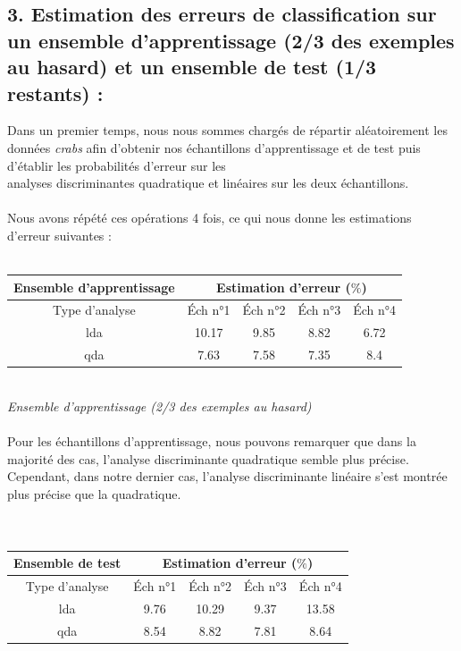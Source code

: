 \documentclass[a4paper, 10pt]{article}
\begin{document}
\newpage
\subsection*{3. Estimation des erreurs de classification sur un ensemble d'apprentissage (2/3 des exemples au hasard)
et un ensemble de test (1/3 restants) :}
Dans un premier temps, nous nous sommes chargés de répartir aléatoirement les données \textit{crabs} afin d'obtenir nos échantillons
d'apprentissage et de test puis d'établir les probabilités d'erreur sur les\\analyses discriminantes quadratique et linéaires
sur les deux échantillons.\\ \\
Nous avons répété ces opérations 4 fois, ce qui nous donne les estimations d'erreur suivantes :\\ \\
\begin{tabular}{|c|c|c|c|c|}
\hline
\textbf{Ensemble d'apprentissage} & \multicolumn{4}{|c|}{Estimation d'erreur ($\%$)} \\
\hline
Type d'analyse & Éch n°1 & Éch n°2 & Éch n°3 & Éch n°4 \\
\hline
lda & 10.17 & 9.85 & 8.82 & 6.72 \\
\hline
qda & 7.63 & 7.58 & 7.35 & 8.4 \\
\hline
\end{tabular}\\
\textit{Ensemble d'apprentissage (2/3 des exemples au hasard)}\\ \\
Pour les échantillons d'apprentissage, nous pouvons remarquer que dans la majorité des cas,
l'analyse discriminante quadratique semble plus précise.
Cependant, dans notre dernier cas, l'analyse discriminante linéaire s'est montrée plus précise que la quadratique.\\ \\ \\
\begin{tabular}{|c|c|c|c|c|}
\hline
\textbf{Ensemble de test} & \multicolumn{4}{|c|}{Estimation d'erreur ($\%$)} \\
\hline
Type d'analyse & Éch n°1 & Éch n°2 & Éch n°3 & Éch n°4 \\
\hline
lda & 9.76 & 10.29 & 9.37 & 13.58 \\
\hline
qda & 8.54 & 8.82 & 7.81 & 8.64 \\
\hline
\end{tabular}\\
\end{document}
